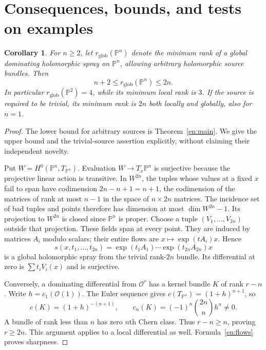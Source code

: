 \documentclass[12pt]{amsart}
\newtheorem{cor}[thm]{Corollary}
\theoremstyle{definition}
\theoremstyle{remark}
\numberwithin{equation}{section}
\newcommand{\cO}{\mathcal{O}}
\newcommand{\mP}{\mathbb{P}}
\begin{document}
\section{Consequences, bounds, and tests on examples}
\begin{cor}\label{en:globalbounds}
For $n\geq2$, let $r_{\mathrm{glob}}(\mP^n)$ denote the minimum rank of a global dominating holomorphic spray on $\mP^n$, allowing arbitrary holomorphic source bundles. Then
\[
n+2\leq r_{\mathrm{glob}}(\mP^n)\leq2n.
\]
In particular $r_{\mathrm{glob}}(\mP^2)=4$, while its minimum local rank is $3$. If the source is required to be trivial, its minimum rank is $2n$ both locally and globally, also for $n=1$.
\end{cor}
\begin{proof}
The lower bound for arbitrary sources is Theorem~\ref{en:main}. We give the upper bound and the trivial-source assertion explicitly, without claiming their independent novelty.

Put $W=H^0(\mP^n,T_{\mP^n})$. Evaluation $W\to T_x\mP^n$ is surjective because the projective linear action is transitive. In $W^{2n}$, the tuples whose values at a fixed $x$ fail to span have codimension $2n-n+1=n+1$, the codimension of the matrices of rank at most $n-1$ in the space of $n\times2n$ matrices. The incidence set of bad tuples and points therefore has dimension at most $\dim W^{2n}-1$. Its projection to $W^{2n}$ is closed since $\mP^n$ is proper. Choose a tuple $(V_1,\ldots,V_{2n})$ outside that projection. These fields span at every point. They are induced by matrices $A_i$ modulo scalars; their entire flows are $x\mapsto\exp(tA_i)x$. Hence
\begin{equation}\label{en:flows}
s(x,t_1,\ldots,t_{2n})
=\exp(t_1A_1)\cdots\exp(t_{2n}A_{2n})x
\end{equation}
is a global holomorphic spray from the trivial rank-$2n$ bundle. Its differential at zero is $\sum t_iV_i(x)$ and is surjective.

Conversely, a dominating differential from $\cO^r$ has a kernel bundle $K$ of rank $r-n$. Write $h=c_1(\cO(1))$. The Euler sequence gives $c(T_{\mP^n})=(1+h)^{n+1}$, so
\[
c(K)=(1+h)^{-(n+1)},\qquad
c_n(K)=(-1)^n\binom{2n}{n}h^n\ne0.
\]
A bundle of rank less than $n$ has zero $n$th Chern class. Thus $r-n\geq n$, proving $r\geq2n$. This argument applies to a local differential as well. Formula~\eqref{en:flows} proves sharpness.
\end{proof}
\end{document}
